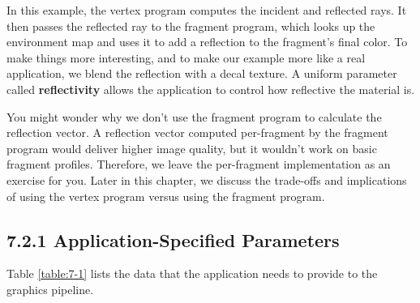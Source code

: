 \documentclass[../main.tex]{subfiles}
\begin{document}
In this example, the vertex program computes the incident and reflected rays. It then passes the reflected ray to the fragment program, which looks up the environment map and uses it to add a reflection to the fragment's final color. To make things more interesting, and to make our example more like a real application, we blend the reflection with a decal texture. A uniform parameter called \textbf{reflectivity} allows the application to control how reflective the material is.

You might wonder why we don't use the fragment program to calculate the reflection vector. A reflection vector computed per-fragment by the fragment program would deliver higher image quality, but it wouldn't work on basic fragment profiles. Therefore, we leave the per-fragment implementation as an exercise for you. Later in this chapter, we discuss the trade-offs and implications of using the vertex program versus using the fragment program.

\subsection{7.2.1 Application-Specified Parameters}

Table \ref{table:7-1} lists the data that the application needs to provide to the graphics pipeline.
\end{document}
